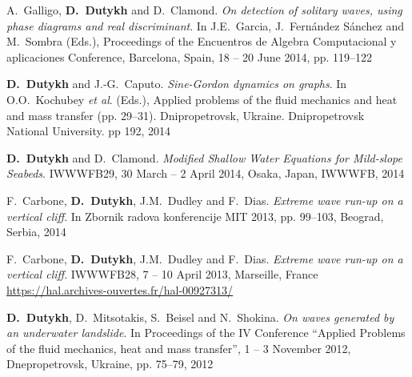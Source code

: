 \begin{etaremune}

  
  \item A.~Galligo, \textbf{D.~Dutykh} and D.~Clamond. \textit{On detection of solitary waves, using phase diagrams and real discriminant}. In J.E.~Garcia, J.~Fern\'andez S\'anchez and M.~Sombra (Eds.), Proceedings of the Encuentros de Algebra Computacional y aplicaciones Conference, Barcelona, Spain, 18 -- 20 June 2014, pp. 119--122 %
  
  \item \textbf{D.~Dutykh} and J.-G.~Caputo. \textit{Sine-Gordon dynamics on graphs}. In O.O.~Kochubey \emph{et al}. (Eds.), Applied problems of the fluid mechanics and heat and mass transfer (pp. 29--31). Dnipropetrovsk, Ukraine. Dnipropetrovsk National University. pp 192, 2014 %
  
  \item \textbf{D.~Dutykh} and D.~Clamond. \textit{Modified Shallow Water Equations for Mild-slope Seabeds}. IWWWFB29, 30 March -- 2 April 2014, Osaka, Japan, IWWWFB, 2014 %
  
  \item F.~Carbone, \textbf{D.~Dutykh}, J.M.~Dudley and F.~Dias. \textit{Extreme wave run-up on a vertical cliff}. In Zbornik radova konferencije MIT 2013, pp. 99--103, Beograd, Serbia, 2014 %
  

  
  \item F.~Carbone, \textbf{D.~Dutykh}, J.M.~Dudley and F.~Dias. \textit{Extreme wave run-up on a vertical cliff}. IWWWFB28, 7 -- 10 April 2013, Marseille, France \\ %
  \url{https://hal.archives-ouvertes.fr/hal-00927313/}
  

  
  \item \textbf{D.~Dutykh}, D.~Mitsotakis, S.~Beisel and N.~Shokina. \textit{On waves generated by an underwater landslide}. In Proceedings of the IV Conference ``Applied Problems of the fluid mechanics, heat and mass transfer'', 1 -- 3 November 2012, Dnepropetrovsk, Ukraine, pp. 75--79, 2012 %
  

\end{etaremune}
